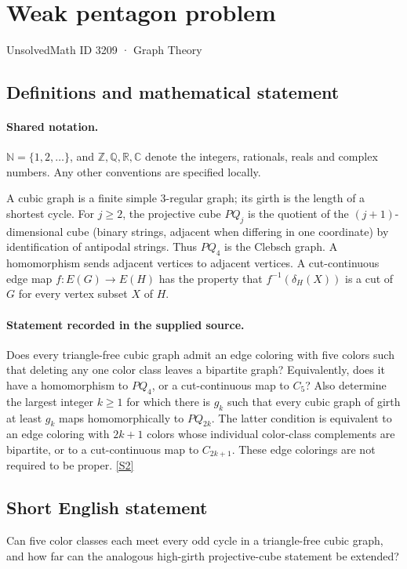 \documentclass[11pt]{article}
\newcommand{\sref}[2]{\hyperlink{source:#1:#2}{[S#2]}}
\begin{document}
\setcounter{section}{3208}
\section{Weak pentagon problem}\label{3209}
{\small\sffamily UnsolvedMath ID 3209 · Graph Theory}
\subsection{Definitions and mathematical statement}

\paragraph{Shared notation.}$\mathbb N=\{1,2,\ldots\}$, and $\mathbb Z,\mathbb Q,\mathbb R,\mathbb C$ denote the integers, rationals, reals and complex numbers. Any other conventions are specified locally.


A cubic graph is a finite simple $3$-regular graph; its girth is the length of a shortest cycle. For $j\ge2$, the projective cube $PQ_j$ is the quotient of the $(j+1)$-dimensional cube (binary strings, adjacent when differing in one coordinate) by identification of antipodal strings. Thus $PQ_4$ is the Clebsch graph. A homomorphism sends adjacent vertices to adjacent vertices. A cut-continuous edge map $f:E(G)\to E(H)$ has the property that $f^{-1}(\delta_H(X))$ is a cut of $G$ for every vertex subset $X$ of $H$.
\paragraph{Statement recorded in the supplied source.}
Does every triangle-free cubic graph admit an edge coloring with five colors such that deleting any one color class leaves a bipartite graph? Equivalently, does it have a homomorphism to $PQ_4$, or a cut-continuous map to $C_5$? Also determine the largest integer $k\ge1$ for which there is $g_k$ such that every cubic graph of girth at least $g_k$ maps homomorphically to $PQ_{2k}$. The latter condition is equivalent to an edge coloring with $2k+1$ colors whose individual color-class complements are bipartite, or to a cut-continuous map to $C_{2k+1}$. These edge colorings are not required to be proper. \sref{3209}{2}
\subsection{Short English statement}
Can five color classes each meet every odd cycle in a triangle-free cubic graph, and how far can the analogous high-girth projective-cube statement be extended?
\end{document}
